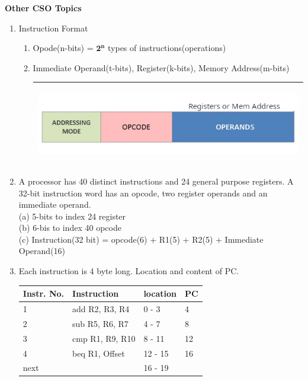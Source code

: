 
\centerline{\textbf{ \LARGE Other CSO Topics}}

\begin{enumerate}

    \item Instruction Format
    \begin{enumerate}
      \item Opode(n-bits) = { \large \(  \mathbf{ 2^n }\) } types of instructions(operations)
      \item Immediate Operand(t-bits), Register(k-bits), Memory Address(m-bits)

          \begin{myTableStyle} \begin{tabular}{ |m{14cm}| } \hline
             \begin{center} \includegraphics[scale=1]{./images/Instruction-Format.jpg} \end{center}\\ \hline
          \end{tabular} \end{myTableStyle} \vspace{0.08in}
    \end{enumerate}
    \item A processor has 40 distinct instructions and 24 general purpose registers.
             A 32-bit instruction word has an opcode, two register operands and an immediate operand.
             \\ (a) 5-bits to index 24 register
             \\ (b) 6-bis to index 40 opcode
             \\ (c) Instruction(32 bit) = opcode(6) + R1(5) + R2(5) + Immediate Operand(16)

    \item Each instruction is 4 byte long. Location and content of PC.

             \begin{myTableStyle} \begin{tabular}{ |m{2cm}|m{3cm}|m{2cm}|m{1cm}| } \hline
                Instr. No. & Instruction  & location & PC\\ \hline
                1 & add R2, R3, R4 & 0 - 3 & 4\\ \hline
                2 & sub R5, R6, R7 & 4 - 7 & 8\\ \hline
                3 & cmp R1, R9, R10 & 8 - 11 & 12\\ \hline
                4 & beq R1, Offset & 12 - 15 & 16\\ \hline
                next & & 16 - 19 & \\ \hline
             \end{tabular} \end{myTableStyle} \vspace{0.08in}



\end{enumerate}
